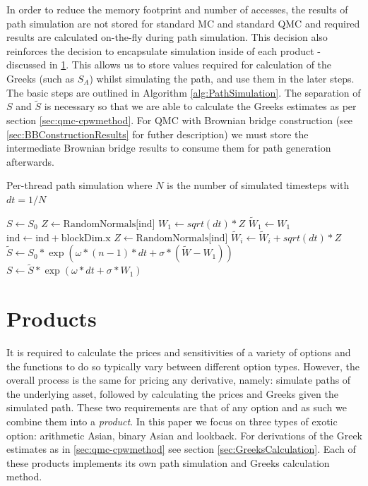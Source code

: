 In order to reduce the memory footprint and number of accesses, the results of path simulation are not stored for standard MC and standard QMC and required results are calculated on-the-fly during path simulation. This decision also reinforces the decision to encapsulate simulation inside of each product - discussed in \ref{sec:Products}. This allows us to store values required for calculation of the Greeks (such as $S_A$) whilst simulating the path, and use them in the later steps. The basic steps are outlined in Algorithm \ref{alg:PathSimulation}. The separation of $S$ and $\widetilde{S}$ is necessary so that we are able to calculate the Greeks estimates as per section \ref{sec:qmc-cpwmethod}. For QMC with Brownian bridge construction (see \ref{sec:BBConstructionResults} for futher description) we must store the intermediate Brownian bridge results to consume them for path generation afterwards.

\begin{algorithm}[hbt!]
\caption{Per-thread path simulation where $N$ is the number of simulated timesteps with $dt = 1/N$}\label{alg:PathSimulation}
\begin{algorithmic}[1]
\State $S \gets S_0$
\State $Z \gets \text{RandomNormals[ind]}$
\State $W_1 \gets sqrt(dt) * Z$
\State $\widetilde{W}_1 \gets W_1$
    \State $\text{ind} \gets \text{ind} + \text{blockDim.x}$ 
    \State $Z \gets \text{RandomNormals[ind]}$
    \State $\widetilde{W}_i \gets \widetilde{W}_i + sqrt(dt) * Z$
    \State $\widetilde{S} \gets S_0 * \exp{(\omega * (n-1)*dt + \sigma * (\widetilde{W} - W_1))}$
    \State $S \gets \widetilde{S} * \exp{(\omega * dt + \sigma * W_1)}$
\EndFor
\end{algorithmic}
\end{algorithm}

\section{Products} \label{sec:Products}
It is required to calculate the prices and sensitivities of a variety of options and the functions to do so typically vary between different option types. However, the overall process is the same for pricing any derivative, namely: simulate paths of the underlying asset, followed by calculating the prices and Greeks given the simulated path. These two requirements are that of any option and as such we combine them into a \textit{product}. In this paper we focus on three types of exotic option: arithmetic Asian, binary Asian and lookback. For derivations of the Greek estimates as in \ref{sec:qmc-cpwmethod} see section \ref{sec:GreeksCalculation}. Each of these products implements its own path simulation and Greeks calculation method.

